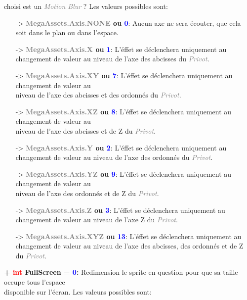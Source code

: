 \documentclass[a4paper, 11pt]{article}
\begin{document}
	choisi est un \textit{\textcolor{gray}{Motion Blur}} ? Les valeurs possibles sont:
	\begin{itemize}
		\item [-> \textbf{\textcolor{gray}{MegaAssets.Axis.NONE} ou \textcolor{blue}{0}}:] Aucun axe ne sera 
		écouter, que cela soit dans le plan ou dans l'espace.
		\item [-> \textbf{\textcolor{gray}{MegaAssets.Axis.X} ou \textcolor{blue}{1}}:] L'éffet se 
		déclenchera uniquement au changement de valeur au niveau de l'axe des abcisses du 
		\textit{\textcolor{gray}{Privot}}.
		\item [-> \textbf{\textcolor{gray}{MegaAssets.Axis.XY} ou \textcolor{blue}{7}}:] L'éffet se 
		déclenchera uniquement au changement de valeur au \\niveau de l'axe des abcisses et des ordonnés du 
		\textit{\textcolor{gray}{Privot}}.
		\item [-> \textbf{\textcolor{gray}{MegaAssets.Axis.XZ} ou \textcolor{blue}{8}}:] L'éffet se 
		déclenchera uniquement au changement de valeur au \\niveau de l'axe des abcisses et de Z du 
		\textit{\textcolor{gray}{Privot}}.
		\item [-> \textbf{\textcolor{gray}{MegaAssets.Axis.Y} ou \textcolor{blue}{2}}:] L'éffet se 
		déclenchera uniquement au changement de valeur au niveau de l'axe des ordonnés du 
		\textit{\textcolor{gray}{Privot}}.
		\item [-> \textbf{\textcolor{gray}{MegaAssets.Axis.YZ} ou \textcolor{blue}{9}}:] L'éffet se 
		déclenchera uniquement au changement de valeur au \\niveau de l'axe des ordonnés et de Z du 
		\textit{\textcolor{gray}{Privot}}.
		\item [-> \textbf{\textcolor{gray}{MegaAssets.Axis.Z} ou \textcolor{blue}{3}}:] L'éffet se 
		déclenchera uniquement au changement de valeur au niveau de l'axe Z du \textit{\textcolor{gray}
		{Privot}}.
		\item [-> \textbf{\textcolor{gray}{MegaAssets.Axis.XYZ} ou \textcolor{blue}{13}}:] L'éffet se 
		déclenchera uniquement au changement de valeur au niveau de l'axe des abcisses, des ordonnés et de Z 
		du \textit{\textcolor{gray}{Privot}}.\\
	\end{itemize}
	\textbf{+ \textcolor{red}{int} FullScreen = \textcolor{blue}{0}:} Redimension le sprite en question pour 
	que sa taille occupe tous l'espace \\disponible sur l'écran. Les valeurs possibles sont:
\end{document}

